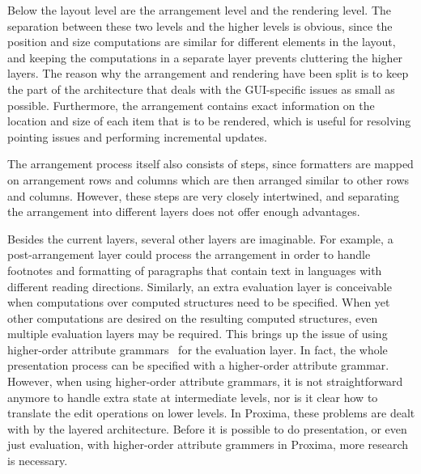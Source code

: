Below the layout level are the arrangement level and the rendering level. The separation between these two levels and the higher levels is obvious, since the position and size computations are similar for different elements in the layout, and keeping the computations in a separate layer prevents cluttering the higher layers. The reason why the arrangement and rendering have been split is to keep the part of the architecture that deals with the GUI-specific issues as small as possible. Furthermore, the arrangement contains exact information on the location and size of each item that is to be rendered, which is useful for resolving pointing issues and performing incremental updates. 

The arrangement process itself also consists of steps, since formatters are mapped on arrangement rows and columns which are then arranged similar to other rows and columns. However, these steps are very closely intertwined, and separating the arrangement into different layers does not offer enough advantages. 

Besides the current layers, several other layers are imaginable. For example, a post-arrangement layer could process the arrangement in order to handle footnotes and formatting of paragraphs that contain text in languages with different reading directions. Similarly, an extra evaluation layer is conceivable when computations over computed structures need to be specified. When yet other computations are desired on the resulting computed structures, even multiple evaluation layers may be required. This brings up the issue of using higher-order attribute grammars~\cite{Hags} for the evaluation layer. In fact, the whole presentation process can be specified with a higher-order attribute grammar. However, when using higher-order attribute grammars, it is not straightforward anymore to handle extra state at intermediate levels, nor is it clear how to translate the edit operations on lower levels. In Proxima, these problems are dealt with by the layered architecture. Before it is possible to do presentation, or even just evaluation, with higher-order attribute grammers in Proxima, more research is necessary.

